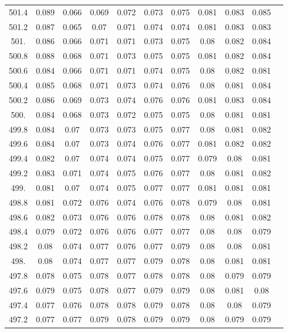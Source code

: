 \documentclass[12pt]{ctexart}
\numberwithin{equation}{section}
\begin{document}
\begin{longtable}{ccccccccccc}
501.4	&	0.089	&	0.066	&	0.069	&	0.072	&	0.073	&	0.075	&	0.081	&	0.083	&	0.085	\\
501.2	&	0.087	&	0.065	&	0.07	&	0.071	&	0.074	&	0.074	&	0.081	&	0.083	&	0.083	\\
501.	&	0.086	&	0.066	&	0.071	&	0.071	&	0.073	&	0.075	&	0.08	&	0.082	&	0.084	\\
500.8	&	0.088	&	0.068	&	0.071	&	0.073	&	0.075	&	0.075	&	0.081	&	0.082	&	0.084	\\
500.6	&	0.084	&	0.066	&	0.071	&	0.071	&	0.074	&	0.075	&	0.08	&	0.082	&	0.081	\\
500.4	&	0.085	&	0.068	&	0.071	&	0.073	&	0.074	&	0.076	&	0.08	&	0.081	&	0.084	\\
500.2	&	0.086	&	0.069	&	0.073	&	0.074	&	0.076	&	0.076	&	0.081	&	0.083	&	0.084	\\
500.	&	0.084	&	0.068	&	0.073	&	0.072	&	0.075	&	0.075	&	0.08	&	0.081	&	0.081	\\
499.8	&	0.084	&	0.07	&	0.073	&	0.073	&	0.075	&	0.077	&	0.08	&	0.081	&	0.082	\\
499.6	&	0.084	&	0.07	&	0.073	&	0.074	&	0.076	&	0.077	&	0.081	&	0.082	&	0.082	\\
499.4	&	0.082	&	0.07	&	0.074	&	0.074	&	0.075	&	0.077	&	0.079	&	0.08	&	0.081	\\
499.2	&	0.083	&	0.071	&	0.074	&	0.075	&	0.076	&	0.077	&	0.08	&	0.081	&	0.082	\\
499.	&	0.081	&	0.07	&	0.074	&	0.075	&	0.077	&	0.077	&	0.081	&	0.081	&	0.081	\\
498.8	&	0.081	&	0.072	&	0.076	&	0.074	&	0.076	&	0.078	&	0.079	&	0.08	&	0.081	\\
498.6	&	0.082	&	0.073	&	0.076	&	0.076	&	0.078	&	0.078	&	0.08	&	0.081	&	0.082	\\
498.4	&	0.079	&	0.072	&	0.076	&	0.076	&	0.077	&	0.077	&	0.08	&	0.08	&	0.079	\\
498.2	&	0.08	&	0.074	&	0.077	&	0.076	&	0.077	&	0.079	&	0.08	&	0.08	&	0.081	\\
498.	&	0.08	&	0.074	&	0.077	&	0.077	&	0.079	&	0.078	&	0.08	&	0.081	&	0.081	\\
497.8	&	0.078	&	0.075	&	0.078	&	0.077	&	0.078	&	0.078	&	0.08	&	0.079	&	0.079	\\
497.6	&	0.079	&	0.075	&	0.078	&	0.077	&	0.079	&	0.079	&	0.08	&	0.081	&	0.08	\\
497.4	&	0.077	&	0.076	&	0.078	&	0.078	&	0.079	&	0.078	&	0.08	&	0.08	&	0.079	\\
497.2	&	0.077	&	0.077	&	0.079	&	0.078	&	0.079	&	0.079	&	0.08	&	0.079	&	0.079	\\

\end{longtable}
\end{document}

